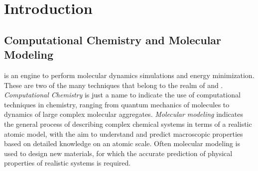%
% 
% 
% 
% 
% 
% 
% 
% 
%

\chapter{Introduction}

\section{Computational Chemistry and Molecular Modeling}

\label{sec:Compchem}

{\gromacs} is an engine to perform molecular dynamics simulations and 
energy minimization. These are two of the many techniques that belong 
to the realm of  and 
. 
{\em Computational Chemistry} is just a name to indicate the use of 
computational techniques in chemistry, ranging from quantum mechanics 
of molecules to dynamics of large complex molecular aggregates. {\em 
Molecular modeling} indicates the general process of describing 
complex chemical systems in terms of a realistic atomic model, with the 
aim to understand and predict macroscopic properties based on detailed 
knowledge on an atomic scale. Often molecular modeling is used to 
design new materials, for which the accurate prediction of physical 
properties of realistic systems is required. 

